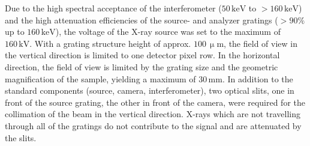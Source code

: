 \documentclass[aip,apl,amsmath,amssymb,floatfix,reprint,a4paper]{revtex4-1}
\newcommand{\unit}[1]{\ensuremath{\, \mathrm{#1}}}
\begin{document}
Due to the high spectral acceptance \cite{Weitkamp2005,Thuering2013c} of the interferometer ($50 \unit{keV}$ to $>160 \unit{keV}$) and the high attenuation efficiencies of the source- and analyzer gratings ($>90\%$ up to $160 \unit{keV}$), the voltage of the X-ray source was set to the maximum of $160 \unit{kV}$. With a grating structure height of approx. $100 \unit{\upmu m}$, the field of view in the vertical direction is limited to one detector pixel row. In the horizontal direction, the field of view is limited by the grating size and the geometric magnification of the sample, yielding a maximum of $30 \unit{mm}$. In addition to the standard components (source, camera, interferometer), two optical slits, one in front of the source grating, the other in front of the camera, were required for the collimation of the beam in the vertical direction. X-rays which are not travelling through all of the gratings do not contribute to the signal and are attenuated by the slits.

\end{document}
